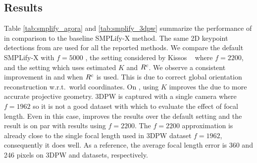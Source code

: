 \documentclass[10pt,twocolumn,letterpaper,usenames,dvipsnames]{article}
\begin{document}
\subsection{\smplify Results}
\label{sec:smplifycam_evaluation}
Table \ref{tab:smplify_agora} and \ref{tab:smplify_3dpw} summarize the performance of \smplify in comparison to the baseline SMPLify-X method. 
The same 2D keypoint detections from \cite{mmpose2020} are used for all the reported methods. 
We compare the default SMPLify-X with $f=5000$ \cite{SMPL-X:2019}, the setting considered by Kissos \etal~\cite{kissosECCVW2020} where $f=2200$, and the setting which uses \camcalib estimated $K$ and $R^c$. 
We observe a consistent improvement in \wmpjpe and \wpve when $R^c$ is used. 
This is due to correct global orientation reconstruction w.r.t.~world coordinates. 
On \agoracam, using $K$ improves the \pampjpe due to more accurate projective geometry. 
3DPW is captured with a single camera where $f=1962$ so it is not a good dataset with which to evaluate the effect of focal length.
Even in this case, \smplify improves the results over the default setting and the \pampjpe result is on par with results using $f=2200$. 
The $f=2200$ approximation is already close to the single focal length used in 3DPW dataset $f=1962$, consequently it does well.
As a reference, the average \camcalib focal length error is 360 and 246 pixels on 3DPW and \agoracam datasets, respectively.
\end{document}

